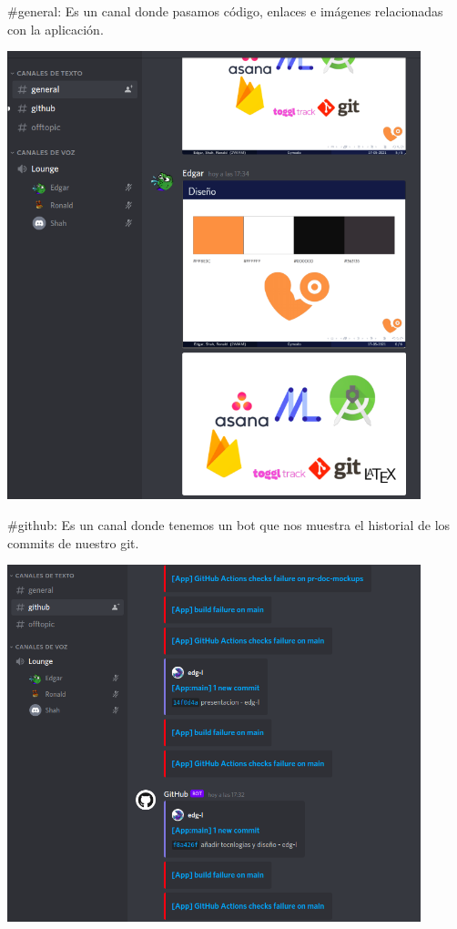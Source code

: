 \documentclass[12pt,a4paper]{article}
\begin{document}
\begin{enumerate}
\begin{minipage}{.60\textwidth}
  \item \#general: Es un canal donde pasamos código, enlaces e imágenes relacionadas con la aplicación.
\end{minipage}
\begin{minipage}{.40\textwidth}
  \includegraphics[width=0.9\textwidth, right]{general}
\end{minipage}


\begin{minipage}{.60\textwidth}
  \item \#github: Es un canal donde tenemos un bot que nos muestra el historial de los commits de nuestro git.
\end{minipage}
\begin{minipage}{.40\textwidth}
  \includegraphics[width=0.9\textwidth, right]{github}
\end{minipage}

\end{enumerate} 
\end{document}
